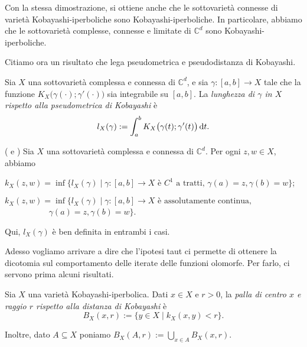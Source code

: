 \begin{oss} \label{kobisdist}
    Con la stessa dimostrazione, si ottiene anche che le sottovarietà connesse di varietà Kobayashi-iperboliche sono Kobayashi-iperboliche. In particolare, abbiamo che le sottovarietà complesse, connesse e limitate di $\mathbb{C}^d$ sono Kobayashi-iperboliche.
\end{oss}

Citiamo ora un risultato che lega pseudometrica e pseudodistanza di Kobayashi.

\begin{defn}
    Sia $X$ una sottovarietà complessa e connessa di $\mathbb{C}^d$, e sia $\gamma:[a,b] \longrightarrow X$ tale che la funzione $K_X\big(\gamma(\cdot);\gamma'(\cdot)\big)$ sia integrabile su $[a,b]$. La \textit{lunghezza di $\gamma$ in $X$ rispetto alla pseudometrica di Kobayashi} è
    $$l_X(\gamma):=\int_a^b K_X\big(\gamma(t);\gamma'(t)\big)\mathop{}\!\mathrm{d} t.$$
\end{defn}

\begin{thm} \label{lung_int}
    (\cite[Theorem 1]{R} e \cite[Theorem 3.1]{V}) Sia $X$ una sottovarietà complessa e connessa di $\mathbb{C}^d$. Per ogni $z,w \in X$, abbiamo
    \begin{nlist}
        \item $k_X(z,w)=\inf\{l_X(\gamma) \mid \gamma:[a,b] \longrightarrow X\text{ è $C^1$ a tratti, }\gamma(a)=z,\gamma(b)=w\}$;
        \item $k_X(z,w)=\inf\{l_X(\gamma) \mid \gamma:[a,b] \longrightarrow X\text{ è assolutamente continua,}$\\
        $\text{    }\qquad\qquad\,\,\,\,\gamma(a)=z,\gamma(b)=w\}$.
    \end{nlist}

    Qui, $l_X(\gamma)$ è ben definita in entrambi i casi.
\end{thm}

Adesso vogliamo arrivare a dire che l'ipotesi taut ci permette di ottenere la dicotomia sul comportamento delle iterate delle funzioni olomorfe. Per farlo, ci servono prima alcuni risultati.

\begin{defn}
    Sia $X$ una varietà Kobayashi-iperbolica. Dati $x\in X$ e $r>0$, la \textit{palla di centro $x$ e raggio $r$ rispetto alla distanza di Kobayashi} è
    $$B_X(x,r):=\{y\in X\mid k_X(x,y)<r\}.$$

    Inoltre, dato $A\subseteq X$ poniamo $B_X(A,r):=\displaystyle\bigcup_{x\in A} B_X(x,r)$.
\end{defn}

